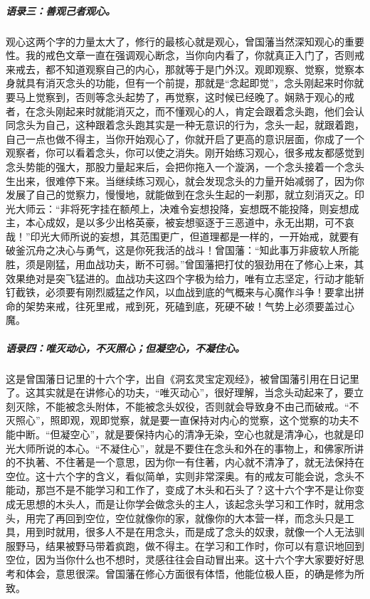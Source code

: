 \subparagraph{语录三：善观己者观心。}

观心这两个字的力量太大了，修行的最核心就是观心，曾国藩当然深知观心的重要性。我的戒色文章一直在强调观心断念，当你向内看了，你就真正入门了，否则戒来戒去，都不知道观察自己的内心，那就等于是门外汉。观即观察、觉察，觉察本身就具有消灭念头的功能，但有一个前提，那就是“念起即觉”，念头刚起来时你就要马上觉察到，否则等念头起势了，再觉察，这时候已经晚了。娴熟于观心的戒者，在念头刚起来时就能消灭之，而不懂观心的人，肯定会跟着念头跑，他们会认同念头为自己，这种跟着念头跑其实是一种无意识的行为，念头一起，就跟着跑，自己一点也做不得主，当你开始观心了，你就开启了更高的意识层面，你成了一个观察者，你可以看着念头，你可以使之消失。刚开始练习观心，很多戒友都感觉到念头势能的强大，那股力量起来后，会把你拖入一个漩涡，一个念头接着一个念头生出来，很难停下来。当继续练习观心，就会发现念头的力量开始减弱了，因为你发展了自己的觉察力，慢慢地，就能做到在念头生起的一刹那，就立刻消灭之。印光大师云：“非将死字挂在额颅上，决难令妄想投降，妄想既不能投降，则妄想成主，本心成奴，是以多少出格英豪，被妄想驱逐于三恶道中，永无出期，可不哀哉！”印光大师所说的妄想，其范围更广，但道理都是一样的，一开始戒，就要有破釜沉舟之决心与勇气，这是你死我活的战斗！曾国藩：“知此事万非疲软人所能胜，须是刚猛，用血战功夫，断不可弱。”曾国藩把打仗的狠劲用在了修心上来，其效果绝对是突飞猛进的。血战功夫这四个字极为给力，唯有立志坚定，行动才能斩钉截铁，必须要有刚烈威猛之作风，以血战到底的气概来与心魔作斗争！要拿出拼命的架势来戒，往死里戒，戒到死，死磕到底，死硬不破！气势上必须要盖过心魔。

\subparagraph{语录四：唯灭动心，不灭照心；但凝空心，不凝住心。}

这是曾国藩日记里的十六个字，出自《洞玄灵宝定观经》，被曾国藩引用在日记里了。这其实就是在讲修心的功夫，“唯灭动心”，很好理解，当念头动起来了，要立刻灭除，不能被念头附体，不能被念头奴役，否则就会导致身不由己而破戒。“不灭照心”，照即观，观即觉察，就是要一直保持对内心的觉察，这个觉察的功夫不能中断。“但凝空心”，就是要保持内心的清净无染，空心也就是清净心，也就是印光大师所说的本心。“不凝住心”，就是不要住在念头和外在的事物上，和佛家所讲的不执著、不住著是一个意思，因为你一有住著，内心就不清净了，就无法保持在空位。这十六个字的含义，看似简单，实则非常深奥。有的戒友可能会说，念头不能动，那岂不是不能学习和工作了，变成了木头和石头了？这十六个字不是让你变成无思想的木头人，而是让你学会做念头的主人，该起念头学习和工作时，就用念头，用完了再回到空位，空位就像你的家，就像你的大本营一样，而念头只是工具，用到时就用，很多人不是在用念头，而是成了念头的奴隶，就像一个人无法驯服野马，结果被野马带着疯跑，做不得主。在学习和工作时，你可以有意识地回到空位，因为当你什么也不想时，灵感往往会自动冒出来。这十六个字大家要好好思考和体会，意思很深。曾国藩在修心方面很有体悟，他能位极人臣，的确是修为所致。

